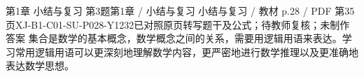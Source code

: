 \par\noindent\begin{minipage}{\linewidth}
\begin{bankitem}{第1章 小结与复习 第3题}{第1章 / 小结与复习 小结与复习 / 教材 p.28 / PDF 第35页}{XJ-B1-C01-SU-P028-Y1232}{已对照原页转写题干及公式；待教师复核；未制作答案}
集合是数学的基本概念，数学概念之间的关系，需要用逻辑用语来表达。学习常用逻辑用语可以更深刻地理解数学内容，更严密地进行数学推理以及更准确地表达数学思想。
\end{bankitem}
\end{minipage}\par\medskip
